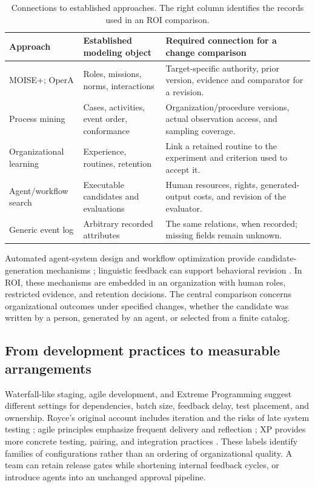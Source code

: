 \begin{table}[t]
\caption{Connections to established approaches. The right column identifies the records used in an ROI comparison.}
\label{tab:crosswalk}\small
\begin{tabularx}{\linewidth}{@{}p{.23\linewidth}YY@{}}\toprule
Approach & Established modeling object & Required connection for a change comparison \\\midrule
MOISE+; OperA & Roles, missions, norms, interactions & Target-specific authority, prior version, evidence and comparator for a revision. \\
Process mining & Cases, activities, event order, conformance & Organization/procedure versions, actual observation access, and sampling coverage. \\
Organizational learning & Experience, routines, retention & Link a retained routine to the experiment and criterion used to accept it. \\
Agent/workflow search & Executable candidates and evaluations & Human resources, rights, generated-output costs, and revision of the evaluator. \\
Generic event log & Arbitrary recorded attributes & The same relations, when recorded; missing fields remain unknown. \\\bottomrule
\end{tabularx}
\end{table}

Automated agent-system design and workflow optimization provide candidate-generation mechanisms \citep{adas,aflow}; linguistic feedback can support behavioral revision \citep{reflexion}. In ROI, these mechanisms are embedded in an organization with human roles, restricted evidence, and retention decisions. The central comparison concerns organizational outcomes under specified changes, whether the candidate was written by a person, generated by an agent, or selected from a finite catalog.

\subsection{From development practices to measurable arrangements}
Waterfall-like staging, agile development, and Extreme Programming suggest different settings for dependencies, batch size, feedback delay, test placement, and ownership. Royce's original account includes iteration and the risks of late system testing \citep{royce}; agile principles emphasize frequent delivery and reflection \citep{agile}; XP provides more concrete testing, pairing, and integration practices \citep{xp}. These labels identify families of configurations rather than an ordering of organizational quality. A team can retain release gates while shortening internal feedback cycles, or introduce agents into an unchanged approval pipeline.

